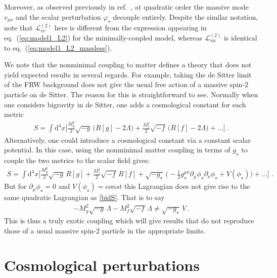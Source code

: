 \documentclass[11pt,a4paper]{article}
\newcommand{\Lcal}{\mathcal{L}}
\newcommand{\bea}{\begin{eqnarray}}
\newcommand{\eea}{\end{eqnarray}}
\newcommand{\eref}[1]{eq.~(\ref{#1})}
\newcommand{\rref}[1]{ref.~\cite{#1}}
\begin{document}
Moreover, as observed previously in \rref{Schmidt-May:2014xla}, at quadratic order the massive mode $v_{\mu\nu}$ and the scalar perturbation $\varphi_\star$ decouple entirely.  Despite the similar notation, note that $\Lcal_{vv}^{(2)}$ here is different from the expression appearing in \eref{eq:model1_L2} for the minimally-coupled model, whereas $\Lcal_{uu}^{(2)}$ is identical to \eref{eq:model1_L2_massless}.   

We note that the nonminimal coupling to matter defines a theory that does not yield expected results in several regards.  For example, taking the de Sitter limit of the FRW background does not give the usual free action of a massive spin-2 particle on de Sitter.  The reason for this is straightforward to see.  Normally when one considers bigravity in de Sitter, one adds a cosmological constant for each metric 
\bea
\label{bidS}
	S = \int \! \mathrm{d}^4x \biggl[ 
	\frac{M_g^2}{2} \sqrt{-g}\, \bigl( R[g]- 2 \Lambda \bigr) 
	+ \frac{M_f^2}{2} \sqrt{-f}\, \bigl( R[f]-2 \Lambda \bigr) 
	+ \ldots 
	\biggr] 
	\;.
\eea
Alternatively, one could introduce a cosmological constant via a constant scalar potential.  In this case, using the nonminimal matter coupling in terms of $g_\star$ to couple the two metrics to the scalar field gives:
\bea
	S = \int \! \mathrm{d}^4x \biggl[ 
	\frac{M_g^2}{2} \sqrt{-g} \, R[g] + \frac{M_f^2}{2} \sqrt{-f} \, R[f] 
	+ \sqrt{-g_\star} \, \bigl( -\tfrac{1}{2} g_\star^{\mu\nu} \partial_\mu \phi_\star \partial_\nu \phi_\star + V(\phi_\star) \bigr) 
	+ \ldots 
	\biggr] 
	\;.
\eea
But for $\partial_\mu \phi_\star = 0$ and $V(\phi_\star) = const $ this Lagrangian does not give rise to the same quadratic Lagrangian as \eqref{bidS}.  That is to say
\bea
    - M_g^2 \sqrt{-g} \, \Lambda - M_f^2 \sqrt{-f} \, \Lambda \neq \sqrt{-g_\star} \, V \, .
\eea
This is thus a truly exotic coupling which will give results that do not reproduce those of a usual massive spin-2 particle in the appropriate limits. 

\section{Cosmological perturbations}
\label{sec:SVT}
\end{document}
